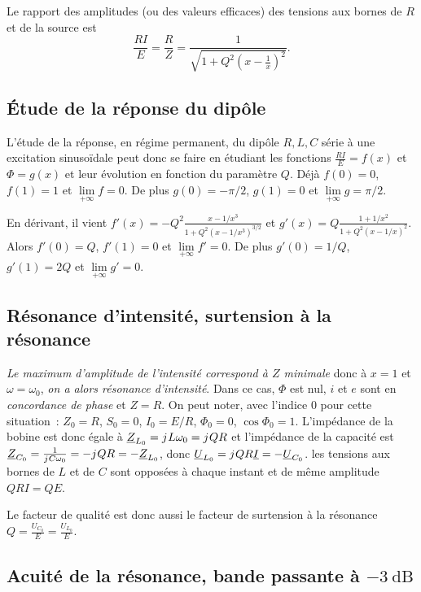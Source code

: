 		Le rapport des amplitudes (ou des valeurs efficaces) des tensions aux bornes de $R$ et de la source est
		\begin{equation}
			\frac{RI}{E} = \frac{R}{Z} = \frac{1}{\sqrt{1+Q^2\left(x-\frac{1}{x}\right)^2}}.
		\end{equation}

	\subsection{Étude de la réponse du dipôle}

	L'étude de la réponse, en régime permanent, du dipôle $R, L, C$ série à une excitation sinusoïdale peut donc se faire en étudiant les fonctions $\frac{RI}{E} = f(x)$ et $\Phi = g(x)$ et leur évolution en fonction du paramètre $Q$. Déjà $f(0) = 0$, $f(1) = 1$ et  $\lim\limits_{+\infty} f = 0$. De plus $g(0) = -\pi/2$, $g(1) = 0$ et $\lim\limits_{+\infty} g = \pi/2$.
	
	En dérivant, il vient $f'(x) = -Q^2 \frac{x-1/x^3}{1+Q^2(x-1/x^3)^{3/2}}$ et $g'(x) = Q \frac{1+1/x^2}{1+Q^2(x-1/x)^2}$. Alors $f'(0) = Q$, $f'(1) = 0$ et $\lim\limits_{+\infty} f' = 0$. De plus $g'(0) = 1/Q$, $g'(1) = 2Q$ et $\lim\limits_{+\infty} g' = 0$.
	
	\subsection{Résonance d'intensité, surtension à la résonance}
		\emph{Le maximum d'amplitude de l'intensité correspond à $Z$ minimale} donc à $x=1$ et $\omega = \omega_0$, \emph{on a alors résonance d'intensité}. Dans ce cas, $\Phi$ est nul, $i$ et $e$ sont en \emph{concordance de phase} et $Z=R$. On peut noter, avec l'indice 0 pour cette situation~: $Z_0 = R$, $S_0=0$, $I_0 = E/R$, $\Phi_0=0$, $\cos\Phi_0 = 1$. L'impédance de la bobine est donc égale à $\underline{Z}_{L_0} ={j\mkern1mu} L \omega_0 = {j\mkern1mu} Q R$ et l'impédance de la capacité est $\underline{Z}_{C_0}=\frac{1}{{j\mkern1mu} C \omega_0}=-{j\mkern1mu} Q R = -\underline{Z}_{L_0}$, donc $\underline{U}_{L_0} = {j\mkern1mu} Q R \underline{I} = -\underline{U}_{C_0}$. les tensions aux bornes de $L$ et de $C$ sont opposées à chaque instant et de même amplitude $QRI = QE$.
		
		Le facteur de qualité est donc aussi le facteur de surtension à la résonance $ Q = \frac{U_{C_0}}{E} = \frac{U_{L_0}}{E}$.
		
	\subsection{Acuité de la résonance, bande passante à $\SI{-3}{\dB}$} 
	
